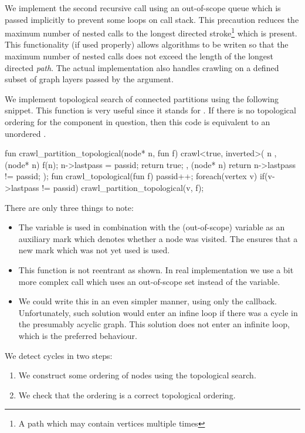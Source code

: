 We implement the second recursive call using an out-of-scope queue which is passed implicitly to prevent some loops on call stack. This precaution reduces the maximum number of nested calls to the longest directed stroke\footnote{A path which may contain vertices multiple times} which is present. This functionality (if used properly) allows algorithms to be writen so that the maximum number of nested calls does not exceed the length of the longest directed \emph{path}. The actual implementation also handles crawling on a defined subset of graph layers passed by the  argument.

We implement topological search of connected partitions using the following snippet. This function is very useful since it stands for . If there is no topological ordering for the component in question, then this code is equivalent to an unordered .

\mybeginfig %
\begin{code}
fun crawl_partition_topological(node* n, fun f)
{
  crawl<true, inverted>( n
    , (node* n){ f(n); n->lastpass = passid; return true;}
    , (node* n){ return n->lastpass != passid;}
  );
}
fun crawl_topological(fun f)
{
  passid++;
  foreach(vertex v)
    if(v->lastpass != passid)
      crawl_partition_topological(v, f);
}
\end{code}

There are only three things to note:
\begin{itemize}
  \item The  variable is used in combination with the (out-of-scope)  variable as an auxiliary mark which denotes whether a node was visited. The  ensures that a new mark which was not yet used is used.
  \item This function is not reentrant as shown. In real implementation we use a bit more complex call which uses an out-of-scope set instead of the  variable. 
  \item We could write this in an even simpler manner, using only the  callback. Unfortunately, such solution would enter an infine loop if there was a cycle in the presumably acyclic graph. This solution does not enter an infinite loop, which is the preferred behaviour. 
\end{itemize}

We detect cycles in two steps:
\begin{enumerate}
  \item We construct some ordering of nodes using the topological search.
  \item We check that the ordering is a correct topological ordering.
\end{enumerate}

